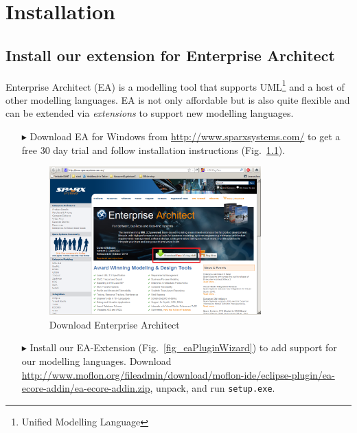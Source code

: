 \chapter{Installation}
\label{chap:installation}

\section{Install our extension for Enterprise Architect}
Enterprise Architect (EA) is a modelling tool that supports UML\footnote{Unified Modelling Language} and a host of other modelling languages.
EA is not only affordable but is also quite flexible and can be extended via \emph{extensions} to support new modelling languages.
\begin{enumerate}
\item[$\blacktriangleright$] Download EA for Windows from \url{http://www.sparxsystems.com/} to get a free 30 day trial and follow installation instructions (Fig.~\ref{fig_enterpriseArchitextHomepage}).

\begin{figure}[htbp]
	\centering
  	\includegraphics[width=0.77\textwidth]{pics/installationAndSetup/ea_download.png}
	\caption{Download Enterprise Architect}
	\label{fig_enterpriseArchitextHomepage}
\end{figure} 

\item[$\blacktriangleright$] Install our EA-Extension (Fig.~\ref{fig_eaPluginWizard}) to add support for our modelling languages.
Download \url{http://www.moflon.org/fileadmin/download/moflon-ide/eclipse-plugin/ea-ecore-addin/ea-ecore-addin.zip}, unpack, and run \texttt{setup.exe}.


\end{enumerate}
